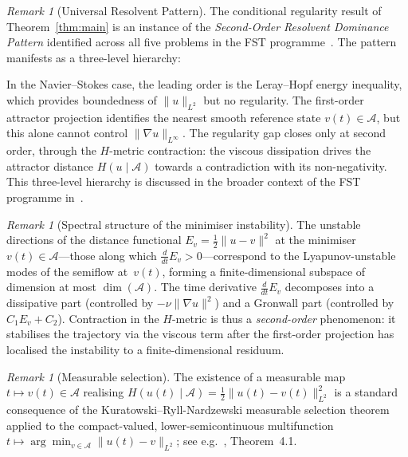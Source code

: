 \documentclass[12pt,a4paper]{article}
\theoremstyle{definition}
\theoremstyle{plain}
\theoremstyle{remark}
\newtheorem{remark}[definition]{Remark}
\begin{document}
\begin{remark}[Universal Resolvent Pattern]\label{rem:universal-resolvent}
The conditional regularity result of Theorem~\ref{thm:main} is an instance of the
\emph{Second-Order Resolvent Dominance Pattern} identified across all five
problems in the FST programme~\cite{FST-Unified2026}. The pattern manifests as
a three-level hierarchy:

\noindent
In the Navier--Stokes case, the leading order is the Leray--Hopf energy
inequality, which provides boundedness of $\|u\|_{L^2}$ but no regularity.
The first-order attractor projection identifies the nearest smooth
reference state $v(t) \in \mathcal{A}$, but this alone cannot control
$\|\nabla u\|_{L^\infty}$.  The regularity gap closes only at second
order, through the $H$-metric contraction: the viscous dissipation
drives the attractor distance $H(u \mid \mathcal{A})$ towards a
contradiction with its non-negativity.  This three-level hierarchy is
discussed in the broader context of the FST programme
in~\cite{FST-Unified2026}.
\end{remark}

\begin{remark}[Spectral structure of the minimiser instability]
\label{rem:resolvent-minimiser}
The unstable directions of the distance functional $E_v = \frac{1}{2}\|u-v\|^2$
at the minimiser $v(t) \in \mathcal{A}$---those along which
$\frac{d}{dt}E_v > 0$---correspond to the Lyapunov-unstable modes of the
semiflow at~$v(t)$, forming a finite-dimensional subspace of dimension
at most $\dim(\mathcal{A})$.  The time derivative $\frac{d}{dt}E_v$
decomposes into a dissipative part (controlled by $-\nu\|\nabla u\|^2$)
and a Gronwall part (controlled by $C_1 E_v + C_2$).  Contraction in the
$H$-metric is thus a \emph{second-order} phenomenon: it stabilises the
trajectory via the viscous term after the first-order projection has
localised the instability to a finite-dimensional residuum.
\end{remark}

\begin{remark}[Measurable selection]
\label{rem:selection}
The existence of a measurable map $t\mapsto v(t)\in\mathcal{A}$ realising
$H(u(t)\mid\mathcal{A}) = \tfrac12\|u(t)-v(t)\|_{L^2}^2$ is a standard
consequence of the Kuratowski--Ryll-Nardzewski measurable selection theorem applied
to the compact-valued, lower-semicontinuous multifunction
$t\mapsto \arg\min_{v\in\mathcal{A}}\|u(t)-v\|_{L^2}$; see e.g.\ \cite{Wagner1977}, Theorem~4.1.
\end{remark}
\end{document}
